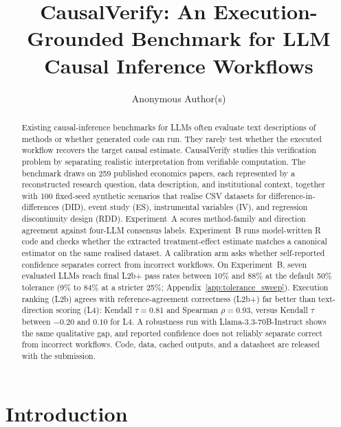 \documentclass{article}
\title{CausalVerify: An Execution-Grounded Benchmark for LLM\\ Causal Inference Workflows}
\author{Anonymous Author(s)}
\begin{document}
\maketitle

\begin{abstract}
Existing causal-inference benchmarks for LLMs often evaluate text
descriptions of methods or whether generated code can run. They rarely
test whether the executed workflow recovers the target causal estimate.
CausalVerify studies this verification problem by separating realistic
interpretation from verifiable computation. The benchmark draws on 259
published economics papers, each represented by a reconstructed research
question, data description, and institutional context, together with 100
fixed-seed synthetic scenarios that realise CSV datasets for
difference-in-differences (DID), event study (ES), instrumental variables
(IV), and regression discontinuity design (RDD). Experiment~A scores
method-family and direction agreement against four-LLM consensus labels.
Experiment~B runs model-written R code and checks whether the extracted
treatment-effect estimate matches a canonical estimator on the same
realised dataset. A calibration arm asks whether self-reported confidence
separates correct from incorrect workflows. On Experiment~B, seven evaluated LLMs reach final L2b+ pass rates
between 10\% and 88\% at the default 50\% tolerance (9\% to 84\% at
a stricter 25\%; Appendix~\ref{app:tolerance_sweep}).
Execution ranking (L2b) agrees with reference-agreement correctness
(L2b+) far better than text-direction scoring (L4):
Kendall $\tau=0.81$ and Spearman
$\rho=0.93$, versus Kendall $\tau$ between $-0.20$ and $0.10$ for L4. A
robustness run with Llama-3.3-70B-Instruct shows the same qualitative
gap, and reported confidence does not reliably separate correct from
incorrect workflows. Code, data, cached outputs, and a datasheet are
released with the submission.
\end{abstract}

\section{Introduction}
\end{document}
